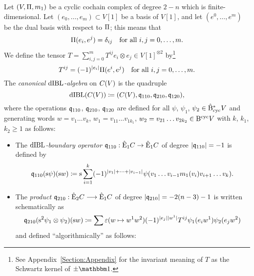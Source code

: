 \documentclass[\MainFolder/Text.tex]{subfiles}
\begin{document}
\begin{Def} \label{Def:CanonicaldIBL}
Let $(V,\Pi,m_1)$ be a cyclic cochain complex of degree $2-n$ which is finite-dimensional. Let $(e_0, \dotsc, e_m)\subset V[1]$ be a basis of $V[1]$, and let $(e^0,\dotsc, e^m)$ be the dual basis with respect to $\Pi$; this means that
$$ \Pi(e_i,e^j) = \delta_{ij}\quad\text{for all }i, j =0, \dotsc,  m. $$
We define the tensor $T = \sum_{i,j=0}^m T^{ij} e_i \otimes e_j \in V[1]^{\otimes 2}$ by\footnote{See Appendix~\ref{Section:Appendix} for the invariant meaning of $T$ as the Schwartz kernel of $\pm \Id$.}
\begin{equation} \label{Eq:PropagatorT}
 T^{ij} = (-1)^{|e_i|} \Pi(e^i,e^j) \quad\text{for all }i,j = 0,\dotsc,m.
\end{equation}
The \emph{canonical $\mathrm{dIBL}$-algebra} on $C(V)$ is the quadruple
$$ \mathrm{dIBL}(C(V)) \coloneqq (C(V),\mathfrak{q}_{110}, \mathfrak{q}_{210}, \mathfrak{q}_{120}), $$
where the operations $\mathfrak{q}_{110}$, $\mathfrak{q}_{210}$, $\mathfrak{q}_{120}$ are defined for all $\psi$, $\psi_1$, $\psi_2 \in \hat{\mathrm{B}}_{\mathrm{cyc}}^* V$ and generating words $w = v_1 \dots v_k$, $w_1 = v_{11}\dots v_{1k_1}$, $w_2 = v_{21}\dots v_{2k_2}\in \mathrm{B}^{\mathrm{cyc}} V$ with $k$, $k_1$, $k_2\ge 1$ as follows:
\begin{itemize}
\item The \emph{$\mathrm{dIBL}$-boundary operator} $\mathfrak{q}_{110}: \hat{\mathrm{E}}_1 C \rightarrow \hat{\mathrm{E}}_1 C$ of degree $|\mathfrak{q}_{110}| = -1$ is defined by
\begin{equation}\label{Eq:Diff}
\mathfrak{q}_{110}(\mathrm{s} \psi)(\mathrm{s} w) \coloneqq \mathrm{s}\sum_{i=1}^k (-1)^{|v_1|+ \dotsb + |v_{i-1}|} \psi(v_1 \dots v_{i-1}m_1(v_i)v_{i+1} \dots v_k).
\end{equation}
\item The \emph{product} $\mathfrak{q}_{210}: \hat{\mathrm{E}}_2 C \longrightarrow \hat{\mathrm{E}}_1 C$ of degree $|\mathfrak{q}_{210}|= -2(n-3)-1$ is written schematically as
$$ \mathfrak{q}_{210}(\mathrm{s}^2 \psi_1 \otimes \psi_2)(\mathrm{s} w) \coloneqq \sum \varepsilon(w\mapsto w^1 w^2)(-1)^{|e_j||w^1|}T^{ij}\psi_{1}(e_i w^1) \psi_2(e_j w^2) $$
and defined ``algorithmically'' as follows:



\end{itemize}
\end{Def}
\end{document}
